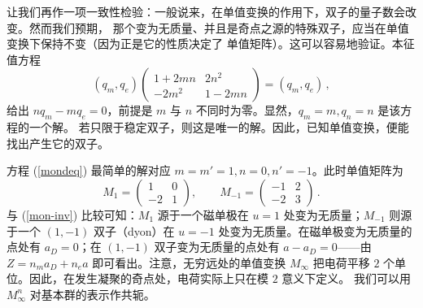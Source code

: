 让我们再作一项一致性检验：一般说来，在单值变换的作用下，双子的量子数会改变。然而我们预期，
那个变为无质量、并且是奇点之源的特殊双子，应当在单值变换下保持不变（因为正是它的性质决定了
单值矩阵）。这可以容易地验证。本征值方程
\begin{equation}
(q_m, q_{e}) \left( \begin{array}{cc}
1+2mn & 2n^{2} \\ -2m^{2} & 1-2mn \end{array} \right ) =
(q_m, q_{e})\,,
\label{mon-inv}
\end{equation}
给出 $nq_m-mq_e=0$，前提是 $m$ 与 $n$ 不同时为零。显然，$q_m=m, q_n=n$ 是该方程的一个解。
若只限于稳定双子，则这是唯一的解。因此，已知单值变换，便能找出产生它的双子。


方程 (\ref{mondeq}) 最简单的解对应 $m=m'=1, n=0, n'=-1$。此时单值矩阵为
\begin{equation}
M_1=\left(\begin{array}{cc}1&0\\-2&1\end{array}\right),\qquad
M_{-1}=\left(\begin{array}{cc}-1&2\\-2&3\end{array}\right)\,.
\label{mondothers}
\end{equation}
与 (\ref{mon-inv}) 比较可知：$M_1$ 源于一个磁单极在 $u=1$ 处变为无质量；$M_{-1}$ 则源于一个
$(1,-1)$ 双子（dyon）在 $u=-1$ 处变为无质量。在磁单极变为无质量的点处有 $a_D=0$；在 $(1,-1)$
双子变为无质量的点处有 $a-a_D=0$——由 $Z=n_m a_D + n_e a$ 即可看出。注意，无穷远处的单值变换
$M_\infty$ 把电荷平移 $2$ 个单位。因此，在发生凝聚的奇点处，电荷实际上只在模 $2$ 意义下定义。
我们可以用 $M^{n}_{\infty}$ 对基本群的表示作共轭。


